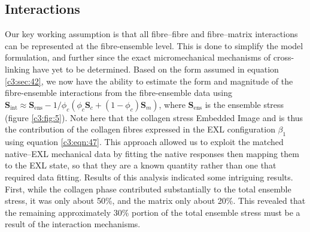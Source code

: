     
\subsection{Interactions}
        
    Our key working assumption is that all fibre–fibre and fibre–matrix interactions can be represented at the fibre-ensemble level. This is done to simplify the model formulation, and further since the exact micromechanical mechanisms of cross-linking have yet to be determined. Based on the form assumed in equation \ref{c3:sec:42}, we now have the ability to estimate the form and magnitude of the fibre-ensemble interactions from the fibre-ensemble data using $\mathbf{S}_\mathrm{int} \approx \mathbf{S}_\mathrm{ens} - 1/\phi_c(\phi_c \mathbf{S}_c + (1 - \phi_c)\mathbf{S}_m)$, where $\mathbf{S}_\mathrm{ens}$ is the ensemble stress (figure \ref{c3:fig:5}). Note here that the collagen stress Embedded Image and is thus the contribution of the collagen fibres expressed in the EXL configuration $\beta_1$ using equation \ref{c3:eqn:47}. This approach allowed us to exploit the matched native–EXL mechanical data by fitting the native responses then mapping them to the EXL state, so that they are a known quantity rather than one that required data fitting. Results of this analysis indicated some intriguing results. First, while the collagen phase contributed substantially to the total ensemble stress, it was only about 50\%, and the matrix only about 20\%. This revealed that the remaining approximately 30\% portion of the total ensemble stress must be a result of the interaction mechanisms.
    

